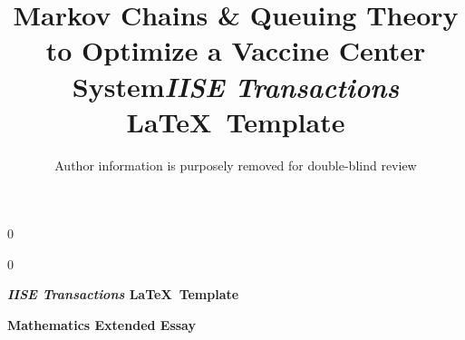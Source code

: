 \documentclass[11pt]{article}
\newcommand{\blind}{0}
\begin{document}
		
		\def\spacingset#1{\renewcommand{\baselinestretch}%
			{#1}\small\normalsize} \spacingset{1}
		
		\blind
		{
			\title{\bf {Markov Chains \& Queuing Theory to Optimize a Vaccine Center System}}
			\author{}
			\date{}
			\maketitle
		} \fi
		
		\blind
		{

            \title{\bf \emph{IISE Transactions} \LaTeX \ Template}
			\author{Author information is purposely removed for double-blind review}
			
\bigskip
			\bigskip
			\bigskip
			\begin{center}
				{\LARGE\bf \emph{IISE Transactions} \LaTeX \ Template}
			\end{center}
			\medskip
		} \fi
		\bigskip
		
	\begin{center}
	    \textbf{Mathematics Extended Essay}
	\end{center}
			
			
			
		\bigskip
		\bigskip
		\bigskip
		\bigskip
		\bigskip
	    \bigskip
		\bigskip
		\bigskip
		\bigskip
		\bigskip
		\bigskip
		\bigskip
		\bigskip
		\bigskip
		\bigskip
	    \bigskip
		\bigskip
		\bigskip
		\bigskip
		\bigskip
		\bigskip
		\bigskip
		\bigskip
		\bigskip
		\bigskip
	    \bigskip
		\bigskip
		\bigskip
		\bigskip
		\bigskip
		\bigskip
		\bigskip
		\bigskip
		\begin{center}
		   
		\end{center}

	\spacingset{1.5} %

\newpage





\tableofcontents

\clearpage

\startcontents[mainsections]

\stopcontents[mainsections]
\end{document}
